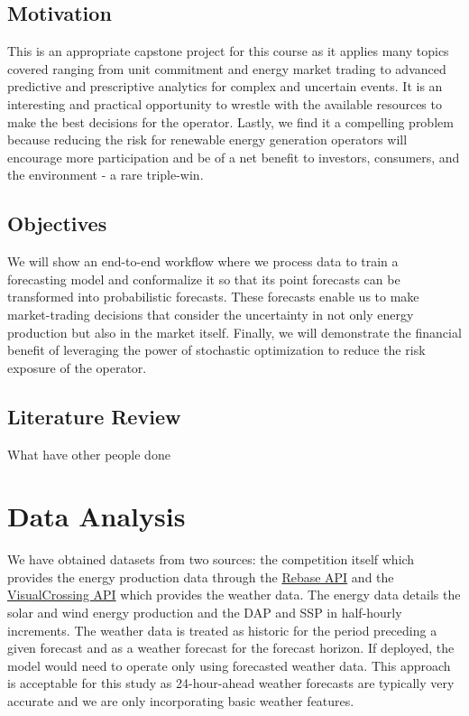\documentclass[
  journal,
]{IEEEtran}%
\begin{document}
\subsection{Motivation}\label{motivation}

This is an appropriate capstone project for this course as it applies
many topics covered ranging from unit commitment and energy market
trading to advanced predictive and prescriptive analytics for complex
and uncertain events. It is an interesting and practical opportunity to
wrestle with the available resources to make the best decisions for the
operator. Lastly, we find it a compelling problem because reducing the
risk for renewable energy generation operators will encourage more
participation and be of a net benefit to investors, consumers, and the
environment - a rare triple-win.

\subsection{Objectives}\label{objectives}

We will show an end-to-end workflow where we process data to train a
forecasting model and conformalize it so that its point forecasts can be
transformed into probabilistic forecasts. These forecasts enable us to
make market-trading decisions that consider the uncertainty in not only
energy production but also in the market itself. Finally, we will
demonstrate the financial benefit of leveraging the power of stochastic
optimization to reduce the risk exposure of the operator.

\subsection{Literature Review}\label{literature-review}

What have other people done

\section{Data Analysis}\label{data-analysis}

We have obtained datasets from two sources: the competition itself which
provides the energy production data through the
\href{https://www.rebase.energy/challenges/heftcom2024}{Rebase API} and
the \href{https://www.visualcrossing.com/weather-api}{VisualCrossing
API} which provides the weather data. The energy data details the solar
and wind energy production and the DAP and SSP in half-hourly
increments. The weather data is treated as historic for the period
preceding a given forecast and as a weather forecast for the forecast
horizon. If deployed, the model would need to operate only using
forecasted weather data. This approach is acceptable for this study as
24-hour-ahead weather forecasts are typically very accurate and we are
only incorporating basic weather features.
\end{document}
